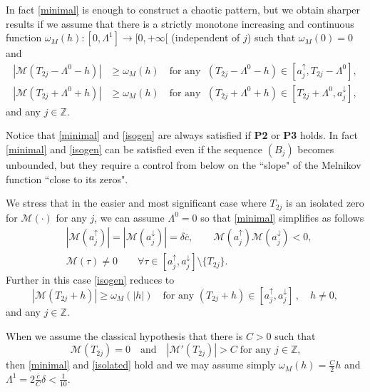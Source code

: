 \documentclass[10pt]{article}
\numberwithin{equation}{section}
\def\Z{{\mathbb Z}}
\def\MM{{\mathcal M}}
\def\dd{\delta}
\def\aup{a^{\uparrow}}
\def\adown{a^{\downarrow}}
\def\lzero{\Lambda^0}
\def\l1{\Lambda^{1}}
\newcommand\assump[1]{{\rm\textbf{#1}}}
\theoremstyle{definition}
\theoremstyle{remark}
\begin{document}
In fact \eqref{minimal} is enough to construct a chaotic pattern, but
we obtain sharper results  if we assume that there is a strictly monotone increasing and continuous function
$\omega_M(h):[0,\l1] \to [0,+\infty[$ (independent of $j$) such that
$\omega_M(0)=0$ and
\begin{equation}\label{isogen}
\begin{split}
      |\MM(T_{2j}- \lzero - h)| & \ge \omega_M(h)  \quad  \textrm{for any } \;  (T_{2j}- \lzero - h)\in  [\aup_j, T_{2j}- \lzero],  \\
  |\MM(T_{2j}+ \lzero + h)| & \ge \omega_M(h)  \quad  \textrm{for any } \;  (T_{2j}+ \lzero + h)\in  [ T_{2j}+ \lzero, \adown_j],
\end{split}
\end{equation}
and any $j \in \Z$.

Notice that \eqref{minimal} and \eqref{isogen} are always satisfied if \assump{P2} or \assump{P3} holds.
In fact \eqref{minimal} and \eqref{isogen} can be satisfied even if the sequence $(B_j)$ becomes unbounded, but they require  a control
from below on the ``slope" of the Melnikov function ``close to its zeros".


  We stress that in the easier and most significant case where $T_{2j}$ is an isolated zero for $\MM(\cdot)$ for any $j$, we
  can assume  $\lzero=0$ so that \eqref{minimal} simplifies as follows
  \begin{equation}\label{defbetaj}
\begin{split}
    &  |\MM(\aup_j)|=|\MM(\adown_j)|= \dd \bar{c}, \qquad \MM(\aup_j) \MM(\adown_j) <0, \\
     & \MM(\tau) \ne 0 \qquad \forall \tau \in [\aup_j,
  \adown_j] \setminus \{T_{2j} \}.
\end{split}
\end{equation}
  Further in this case   \eqref{isogen} reduces to
\begin{equation}\label{isolated}
  |\MM(T_{2j}+ h)| \ge \omega_M(|h|)  \quad  \textrm{for any }  (T_{2j}+ h)\in [\aup_j, \adown_j]\, , \quad h \ne 0,
\end{equation}
and any $j \in \Z$.

When we assume the classical hypothesis that
there is   $C >0$ such that
\begin{equation}\label{nondeg}
  \MM(T_{2j})=0   \quad   \text{and} \quad |\MM'(T_{2j})|>C  \;  \text{for any $j \in \Z$,}
\end{equation}
then \eqref{minimal} and \eqref{isolated} hold and we may assume  simply $ \omega_M(h) = \tfrac{C}{2} h$
 and $\l1 = 2\frac{\bar{c}}{C}  \delta<\tfrac{1}{10}$.
\end{document}
